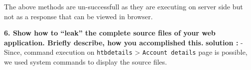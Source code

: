 \begin{Shaded}
\begin{Highlighting}[]
    \OperatorTok{/}\OperatorTok{/}
\end{Highlighting}
\end{Shaded}

\begin{Shaded}
\begin{Highlighting}[]
\end{Highlighting}
\end{Shaded}

\begin{Shaded}
\begin{Highlighting}[]
\end{Highlighting}
\end{Shaded}

The above methods are un-successfull as they are executing on server
side but not as a response that can be viewed in browser.

\textbf{6. Show how to ``leak'' the complete source files of your web
application. Briefly describe, how you accomplished this.}
\textbf{solution :} - Since, command execution on \texttt{htbdetails}
\textgreater{} \texttt{Account\ details} page is possible, we used
system commands to display the source files.

